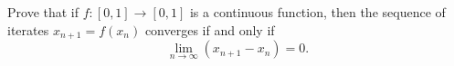 Prove that if \(f\colon [0,1]\to[0,1]\) is a continuous function, then the sequence of iterates \(x_{n+1}=f(x_{n})\) converges if and only if
\[\lim_{n\to \infty}(x_{n+1}-x_{n})=0.\]